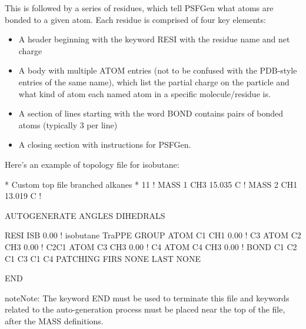 \documentclass[letterpaper,10pt,english]{sphinxmanual}
\begin{document}
This is followed by a series of residues, which tell PSFGen what atoms are bonded to a given atom. Each residue is comprised of four key elements:
\begin{itemize}
\item {} 
A header beginning with the keyword RESI with the residue name and net charge

\item {} 
A body with multiple ATOM entries (not to be confused with the PDB-style entries of the same name), which list the partial charge on the particle and what kind of atom each named atom in a specific molecule/residue is.

\item {} 
A section of lines starting with the word BOND contains pairs of bonded atoms (typically 3 per line)

\item {} 
A closing section with instructions for PSFGen.

\end{itemize}

Here’s an example of topology file for isobutane:

%
\begin{sphinxVerbatim}[commandchars=\\\{\}]
* Custom top file \PYGZhy{}\PYGZhy{} branched alkanes *
11
!
MASS 1 CH3 15.035 C !
MASS 2 CH1 13.019 C !

AUTOGENERATE ANGLES DIHEDRALS

RESI ISB    0.00 !  isobutane \PYGZhy{} TraPPE
GROUP
ATOM C1 CH1 0.00 !  C3
ATOM C2 CH3 0.00 !  C2\PYGZhy{}C1
ATOM C3 CH3 0.00 !  C4
ATOM C4 CH3 0.00 !
BOND C1 C2 C1 C3 C1 C4
PATCHING FIRS NONE LAST NONE

END
\end{sphinxVerbatim}

\begin{sphinxadmonition}{note}{Note:}
The keyword END must be used to terminate this file and keywords related to the auto-generation process must be placed near the top of the file, after the MASS definitions.
\end{sphinxadmonition}
\end{document}
